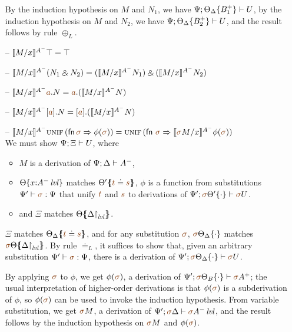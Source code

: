 \begin{itemize}
  By the induction hypothesis on $M$ and $N_1$, we have
  $\foc{\Psi}{\tackon{\Theta_{\Delta}}{B_1^+}}{U}$, by the induction 
  hypothesis on $M$ and $N_2$, we have 
  $\foc{\Psi}{\tackon{\Theta_{\Delta}}{B_2^+}}{U}$, and the
  result follows by rule $\oplus_L$. 


\smallskip

\item[--] $\rsubsta{M}{x}{\ttopr}{A^-} 
           = \ttopr$
\item[--] $\rsubsta{M}{x}{(\twithr{N_1}{N_2})}{A^-} 
           = \twithr{(\rsubsta{M}{x}{N_1}{A^-})}{(\rsubsta{M}{x}{N_2}{A^-})}$

\item[--] $\rsubsta{M}{x}{\texistsl{\lf a}{N}}{A^-} 
           = \texistsl{\lf a}{(\rsubsta{M}{x}{N}{A^-})}$
\item[--] $\rsubsta{M}{x}{\tforallr{\lf a}{N}}{A^-} 
           = \tforallr{\lf a}{(\rsubsta{M}{x}{N}{A^-})}$
\item[--] $\rsubsta{M}{x}{\textsc{unif}\,({\sf fn}\,\lf\sigma \Rightarrow \phi(\lf\sigma))}{A^-} 
           = \textsc{unif}\,({\sf fn}~\lf\sigma \Rightarrow 
              \rsubsta{\lf\sigma{M}}{x}{\phi(\lf\sigma)}{A^-})$\smallskip\\
  We must show $\foc{\Psi}{\Xi}{U}$, where
  \begin{itemize}
  \item $M$ is a derivation of $\foc{\Psi}{\Delta}{A^-}$, 
  \item $\tackon{\Theta}{x{:}\islvl{A^-}}$ matches 
     $\frameoff{\Theta'}{\lf t \doteq \lf s}$, $\phi$ 
     is a function from substitutions $\Psi' \vdash \lf \sigma : \Psi$
     that unify $\lf t$ and $\lf s$ to derivations of 
     $\foc{\Psi'}{\tackon{\lf \sigma\Theta'}{\cdot}}{\lf \sigma{U}}$.
  \item and $\Xi$ matches $\frameoff{\Theta}{\restrictto{\Delta}{\mlvl}}$.
  \end{itemize}

  $\Xi$ matches $\frameoff{\Theta_\Delta}{\lf t \doteq \lf s}$, and 
  for any substitution $\lf \sigma$, $\tackon{\lf \sigma\Theta_\Delta}{\cdot}$
  matches $\frameoff{\lf\sigma\Theta}{\restrictto{\Delta}{\mlvl}}$.
  By rule $\doteq_L$, it suffices to show that, given an arbitrary
  substitution $\Psi' \vdash \lf \sigma : \Psi$, there
  is a derivation of 
  $\foc{\Psi'}{\tackon{\lf\sigma\Theta_\Delta}{\cdot}}{\lf\sigma{U}}$.

  By applying $\lf\sigma$ to $\phi$, we get $\phi(\lf\sigma)$, a derivation 
  of $\foc{\Psi'}{\tackon{\lf\sigma\Theta_B}{\cdot}}{\lf\sigma{A^+}}$;
  the usual interpretation of higher-order derivations is that 
  $\phi(\lf\sigma)$ is a subderivation of $\phi$, so $\phi(\lf\sigma)$ can be
  used to invoke the induction hypothesis.
  From variable substitution, we get $\lf\sigma{M}$, a derivation
  of 
  $\foc{\Psi'}{\lf \sigma\Delta}{\islvl{\lf \sigma{A^-}}}$,
  and the result follows
  by the induction hypothesis on $\lf \sigma{M}$ and 
  $\phi(\lf \sigma)$.

\end{itemize}

